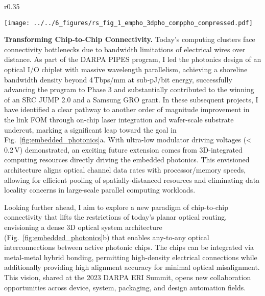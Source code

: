 \begin{wrapfigure}[32]{r}{0.35\textwidth}
    \vspace{-3em}
    \begin{center}
        \texttt{[image: ../../6\_figures/rs\_fig\_1\_empho\_3dpho\_comppho\_compressed.pdf]}
    \end{center}
    \vspace{-1em}
    \caption{(a)~My contribution to interconnect FOM. (b)~Envisioned 3D optical connectivity. (c)~Photonics-enabled computing within data movement.}
    \label{fig:embedded_photonics}
\end{wrapfigure}

\textbf{Transforming Chip-to-Chip Connectivity.} Today's computing clusters face connectivity bottlenecks due to bandwidth limitations of electrical wires over distance. As part of the DARPA PIPES program, I led the photonics design of an optical I/O chiplet with massive wavelength parallelism, achieving a shoreline bandwidth density beyond 4\,Tbps/mm at sub-pJ/bit energy, successfully advancing the program to Phase 3 and substantially contributed to the winning of an SRC JUMP 2.0 and a Samsung GRO grant. In these subsequent projects, I have identified a clear pathway to another order of magnitude improvement in the link FOM through on-chip laser integration and wafer-scale substrate undercut, marking a significant leap toward the goal in Fig.~\ref{fig:embedded_photonics}a. With ultra-low modulator driving voltages (<\,0.2\,V) demonstrated, an exciting future extension comes from 3D-integrated computing resources directly driving the embedded photonics. This envisioned architecture aligns optical channel data rates with processor/memory speeds, allowing for efficient pooling of spatially-distanced resources and eliminating data locality concerns in large-scale parallel computing workloads.

Looking further ahead, I aim to explore a new paradigm of chip-to-chip connectivity that lifts the restrictions of today's planar optical routing, envisioning a dense 3D optical system architecture (Fig.~\ref{fig:embedded_photonics}b) that enables any-to-any optical interconnections between active photonic chips. The chips can be integrated via metal-metal hybrid bonding, permitting high-density electrical connections while
additionally providing high alignment accuracy for minimal optical misalignment. This vision, shared at the 2023 DARPA ERI Summit, opens new collaboration opportunities across device, system, packaging, and design automation fields.

